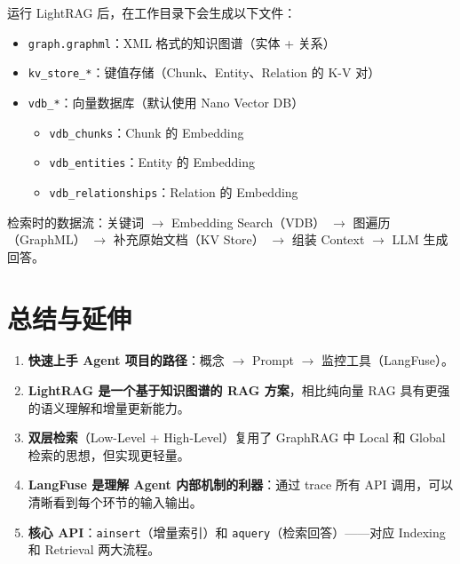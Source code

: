\documentclass[a4paper]{article}
\begin{document}
运行 LightRAG 后，在工作目录下会生成以下文件：

\begin{itemize}
    \item \texttt{graph.graphml}：XML 格式的知识图谱（实体 + 关系）
    \item \texttt{kv\_store\_*}：键值存储（Chunk、Entity、Relation 的 K-V 对）
    \item \texttt{vdb\_*}：向量数据库（默认使用 Nano Vector DB）
    \begin{itemize}
        \item \texttt{vdb\_chunks}：Chunk 的 Embedding
        \item \texttt{vdb\_entities}：Entity 的 Embedding
        \item \texttt{vdb\_relationships}：Relation 的 Embedding
    \end{itemize}
\end{itemize}

检索时的数据流：关键词 $\rightarrow$ Embedding Search（VDB） $\rightarrow$ 图遍历（GraphML） $\rightarrow$ 补充原始文档（KV Store） $\rightarrow$ 组装 Context $\rightarrow$ LLM 生成回答。

\section{总结与延伸}

\begin{enumerate}
    \item \textbf{快速上手 Agent 项目的路径}：概念 $\rightarrow$ Prompt $\rightarrow$ 监控工具（LangFuse）。
    \item \textbf{LightRAG 是一个基于知识图谱的 RAG 方案}，相比纯向量 RAG 具有更强的语义理解和增量更新能力。
    \item \textbf{双层检索}（Low-Level + High-Level）复用了 GraphRAG 中 Local 和 Global 检索的思想，但实现更轻量。
    \item \textbf{LangFuse 是理解 Agent 内部机制的利器}：通过 trace 所有 API 调用，可以清晰看到每个环节的输入输出。
    \item \textbf{核心 API}：\texttt{ainsert}（增量索引）和 \texttt{aquery}（检索回答）——对应 Indexing 和 Retrieval 两大流程。
\end{enumerate}
\end{document}
